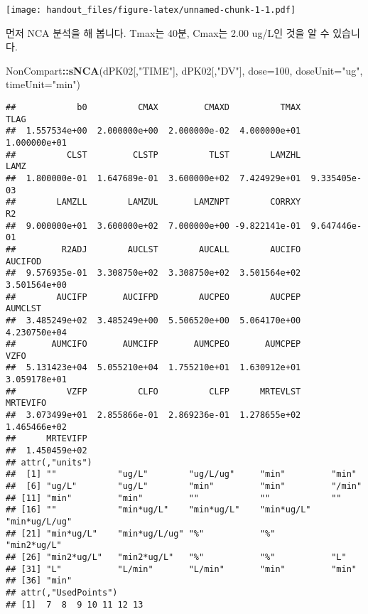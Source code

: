\documentclass[
  9pt,
]{krantz}
\newenvironment{Shaded}{\begin{snugshade}}{\end{snugshade}}
\newcommand{\DataTypeTok}[1]{\textcolor[rgb]{0.13,0.29,0.53}{#1}}
\newcommand{\DecValTok}[1]{\textcolor[rgb]{0.00,0.00,0.81}{#1}}
\newcommand{\KeywordTok}[1]{\textcolor[rgb]{0.13,0.29,0.53}{\textbf{#1}}}
\newcommand{\NormalTok}[1]{#1}
\newcommand{\OperatorTok}[1]{\textcolor[rgb]{0.81,0.36,0.00}{\textbf{#1}}}
\newcommand{\StringTok}[1]{\textcolor[rgb]{0.31,0.60,0.02}{#1}}
\begin{document}
\texttt{[image: handout\_files/figure-latex/unnamed-chunk-1-1.pdf]}

먼저 NCA 분석을 해 봅니다. Tmax는 40분, Cmax는 2.00 ug/L인 것을 알 수 있습니다.

\begin{Shaded}
\begin{Highlighting}[]
\NormalTok{NonCompart}\OperatorTok{::}\KeywordTok{sNCA}\NormalTok{(dPK02[,}\StringTok{"TIME"}\NormalTok{], dPK02[,}\StringTok{"DV"}\NormalTok{], }\DataTypeTok{dose=}\DecValTok{100}\NormalTok{, }\DataTypeTok{doseUnit=}\StringTok{"ug"}\NormalTok{, }\DataTypeTok{timeUnit=}\StringTok{"min"}\NormalTok{)}
\end{Highlighting}
\end{Shaded}

\begin{verbatim}
##            b0          CMAX         CMAXD          TMAX          TLAG 
##  1.557534e+00  2.000000e+00  2.000000e-02  4.000000e+01  1.000000e+01 
##          CLST         CLSTP          TLST        LAMZHL          LAMZ 
##  1.800000e-01  1.647689e-01  3.600000e+02  7.424929e+01  9.335405e-03 
##        LAMZLL        LAMZUL       LAMZNPT        CORRXY            R2 
##  9.000000e+01  3.600000e+02  7.000000e+00 -9.822141e-01  9.647446e-01 
##         R2ADJ        AUCLST        AUCALL        AUCIFO       AUCIFOD 
##  9.576935e-01  3.308750e+02  3.308750e+02  3.501564e+02  3.501564e+00 
##        AUCIFP       AUCIFPD        AUCPEO        AUCPEP       AUMCLST 
##  3.485249e+02  3.485249e+00  5.506520e+00  5.064170e+00  4.230750e+04 
##       AUMCIFO       AUMCIFP       AUMCPEO       AUMCPEP          VZFO 
##  5.131423e+04  5.055210e+04  1.755210e+01  1.630912e+01  3.059178e+01 
##          VZFP          CLFO          CLFP      MRTEVLST      MRTEVIFO 
##  3.073499e+01  2.855866e-01  2.869236e-01  1.278655e+02  1.465466e+02 
##      MRTEVIFP 
##  1.450459e+02 
## attr(,"units")
##  [1] ""            "ug/L"        "ug/L/ug"     "min"         "min"        
##  [6] "ug/L"        "ug/L"        "min"         "min"         "/min"       
## [11] "min"         "min"         ""            ""            ""           
## [16] ""            "min*ug/L"    "min*ug/L"    "min*ug/L"    "min*ug/L/ug"
## [21] "min*ug/L"    "min*ug/L/ug" "%"           "%"           "min2*ug/L"  
## [26] "min2*ug/L"   "min2*ug/L"   "%"           "%"           "L"          
## [31] "L"           "L/min"       "L/min"       "min"         "min"        
## [36] "min"        
## attr(,"UsedPoints")
## [1]  7  8  9 10 11 12 13
\end{verbatim}
\end{document}
